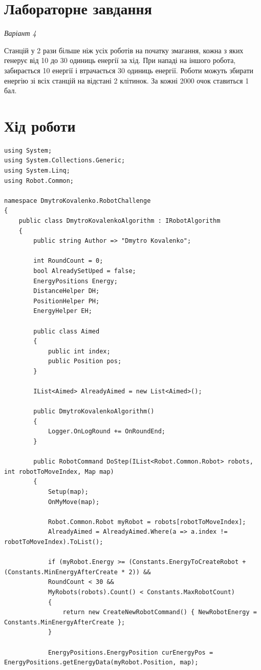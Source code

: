 \documentclass[14pt]{extreport}
\begin{document}
\begin{normalsize}
	\section*{Лабораторне завдання}
	\textit{Варіант 4}
	
		Станцій у 2 рази більше ніж усіх роботів на початку змагання, кожна з яких генерує від
		10 до 30 одиниць енергії за хід. При нападі на іншого робота, забирається 10%
		енергії і втрачається 30 одиниць енергії. Роботи можуть збирати енергію зі всіх станцій
		на відстані 2 клітинок. За кожні 2000 очок ставиться 1 бал.
	
	\section*{Хід роботи}
	
	\begin{small}
		
	
	\begin{lstlisting}
using System;
using System.Collections.Generic;
using System.Linq;
using Robot.Common;

namespace DmytroKovalenko.RobotChallenge
{
	public class DmytroKovalenkoAlgorithm : IRobotAlgorithm
	{
		public string Author => "Dmytro Kovalenko";
		
		int RoundCount = 0;
		bool AlreadySetUped = false;
		EnergyPositions Energy;
		DistanceHelper DH;
		PositionHelper PH;
		EnergyHelper EH;
		
		public class Aimed
		{
			public int index;
			public Position pos;
		}
		
		IList<Aimed> AlreadyAimed = new List<Aimed>();
		
		public DmytroKovalenkoAlgorithm()
		{
			Logger.OnLogRound += OnRoundEnd;
		}
		
		public RobotCommand DoStep(IList<Robot.Common.Robot> robots, int robotToMoveIndex, Map map)
		{
			Setup(map);
			OnMyMove(map);
			
			Robot.Common.Robot myRobot = robots[robotToMoveIndex];
			AlreadyAimed = AlreadyAimed.Where(a => a.index != robotToMoveIndex).ToList();
			
			if (myRobot.Energy >= (Constants.EnergyToCreateRobot + (Constants.MinEnergyAfterCreate * 2)) &&
			RoundCount < 30 &&
			MyRobots(robots).Count() < Constants.MaxRobotCount)
			{
				return new CreateNewRobotCommand() { NewRobotEnergy = Constants.MinEnergyAfterCreate };
			}
			
			EnergyPositions.EnergyPosition curEnergyPos = EnergyPositions.getEnergyData(myRobot.Position, map);
			

\end{lstlisting}
\end{small}
\end{normalsize}
\end{document}
